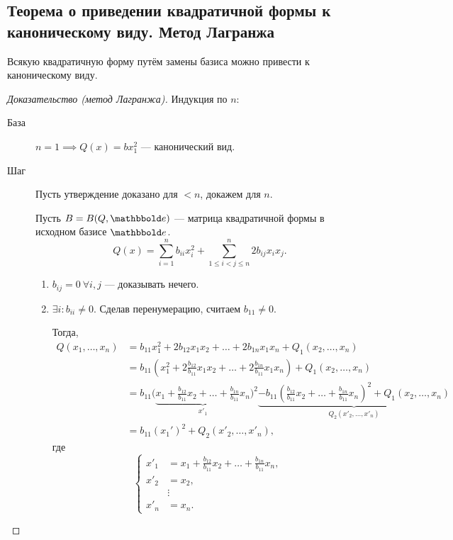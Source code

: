 \subsection{Теорема о приведении квадратичной формы к каноническому виду. Метод Лагранжа}

\begin{theorem}
    Всякую квадратичную форму путём замены базиса можно привести к каноническому виду.
\end{theorem}

\begin{proof}[Доказательство (метод Лагранжа)]
    Индукция по $n$:
    \begin{description}
    \item[База] $n = 1 \implies Q(x) = b x_1^2$ --- канонический вид.
    \item[Шаг] Пусть утверждение доказано для $< n$, докажем для $n$.

        Пусть $B = B(Q, \E)$ --- матрица квадратичной формы в исходном базисе $\E$.
        \begin{equation*}
            Q(x) = \sum_{i = 1}^{n} b_{ii} x_i^2 + \sum_{1 \leq i < j \leq n}^{n} 2 b_{ij} x_i x_j
        .\end{equation*}

        \begin{enumerate}[start=0,label=Случай \arabic*.]
        \item
            $b_{ij} = 0 \ \forall i, j$ --- доказывать нечего.
        \item
            $\exists i : b_{ii} \neq 0$. Сделав перенумерацию, считаем $b_{11} \neq 0$.

            Тогда,
            \begin{align*}
                Q(x_1, \dots, x_n)
                &= b_{11} x_1^2 + 2b_{12} x_1 x_2 + \dots + 2 b_{1n} x_1 x_n + Q_1(x_2, \dots, x_n) \\
                &= b_{11} \left(x_1^2 + 2\frac{b_{12}}{b_{11}} x_1 x_2 + \dots + 2\frac{b_{1n}}{b_{11}} x_1 x_n\right) + Q_1(x_2, \dots, x_n) \\
                &= b_{11} \Bigg(\underbrace{x_1 + \frac{b_{12}}{b_{11}} x_2 + \dots + \frac{b_{1n}}{b_{11}} x_n}_{x'_1}\Bigg)^2 \underbrace{ - b_{11} \left(\frac{b_{12}}{b_{11}}x_2 + \dots + \frac{b_{1n}}{b_{11}} x_n\right)^2 + Q_1(x_2, \dots, x_n)}_{Q_2(x'_2, \dots, x'_n)} \\
                &= b_{11} (x_1')^2 + Q_2 (x'_2, \dots, x'_n)
            ,\end{align*}
            где
            \begin{equation*}
                \begin{cases}
                    x'_1 &= x_1 + \frac{b_{12}}{b_{11}} x_2 + \dots + \frac{b_{1n}}{b_{11}} x_n, \\
                    x'_2 &= x_2, \\
                         &\vdots \\
                    x'_n &= x_n.
                \end{cases}
            \end{equation*}


\end{enumerate}
\end{description}
\end{proof}
